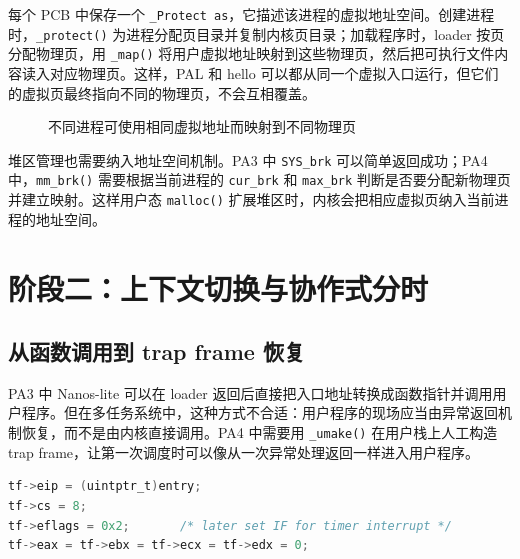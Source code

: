 每个 PCB 中保存一个 \texttt{\_Protect as}，它描述该进程的虚拟地址空间。创建进程时，\texttt{\_protect()} 为进程分配页目录并复制内核页目录；加载程序时，loader 按页分配物理页，用 \texttt{\_map()} 将用户虚拟地址映射到这些物理页，然后把可执行文件内容读入对应物理页。这样，PAL 和 hello 可以都从同一个虚拟入口运行，但它们的虚拟页最终指向不同的物理页，不会互相覆盖。

\begin{figure}[H]
\centering
{}
\caption{不同进程可使用相同虚拟地址而映射到不同物理页}
\label{fig:pa4-address-space}
\end{figure}

堆区管理也需要纳入地址空间机制。PA3 中 \texttt{SYS\_brk} 可以简单返回成功；PA4 中，\texttt{mm\_brk()} 需要根据当前进程的 \texttt{cur\_brk} 和 \texttt{max\_brk} 判断是否要分配新物理页并建立映射。这样用户态 \texttt{malloc()} 扩展堆区时，内核会把相应虚拟页纳入当前进程的地址空间。

\section{阶段二：上下文切换与协作式分时}

\subsection{从函数调用到 trap frame 恢复}

PA3 中 Nanos-lite 可以在 loader 返回后直接把入口地址转换成函数指针并调用用户程序。但在多任务系统中，这种方式不合适：用户程序的现场应当由异常返回机制恢复，而不是由内核直接调用。PA4 中需要用 \texttt{\_umake()} 在用户栈上人工构造 trap frame，让第一次调度时可以像从一次异常处理返回一样进入用户程序。

\begin{lstlisting}[language=C,caption={用户进程初始现场的关键字段},frame=single]
tf->eip = (uintptr_t)entry;
tf->cs = 8;
tf->eflags = 0x2;       /* later set IF for timer interrupt */
tf->eax = tf->ebx = tf->ecx = tf->edx = 0;
\end{lstlisting}

